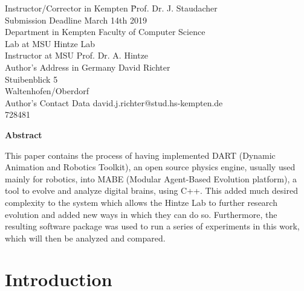 \documentclass[12pt,oneside,listof=totoc,paper=a4,headings=small]{scrbook}
\begin{document}
\parbox{120mm}{
\begin{tabbing}
Instructor/Corrector in Kempten \hspace{1.45cm} \= Prof. Dr. J. Staudacher\\
Submission Deadline                        \> March 14th 2019\\
Department in Kempten                  \> Faculty of Computer Science\\
Lab at MSU \> Hintze Lab\\
Instructor at MSU                   \>Prof. Dr. A. Hintze\\
Author's Address in Germany             \> David Richter\\
																		 \> Stuibenblick 5 \\
                                      Waltenhofen/Oberdorf\\
Author's Contact Data               \> david.j.richter@stud.hs-kempten.de\\
                                     728481
\end{tabbing}
}

\newpage

\vspace*{1cm}

\begin{center}
    \textbf{Abstract}
\end{center}

\vspace*{1cm}

\noindent
This paper contains the process of having implemented DART (Dynamic Animation and Robotics Toolkit), an open source physics engine, usually used mainly for robotics, into MABE (Modular Agent-Based Evolution platform), a tool to evolve and analyze digital brains, using C++. This added much desired complexity to the system which allows the Hintze Lab to further research evolution and added new ways in which they can do so. Furthermore, the resulting software package was used to run a series of experiments in this work, which will then be analyzed and compared.


\tableofcontents
\listoffigures
\lstlistoflistings
\listoftables

\clearpage
\mainmatter
\setcounter{page}{1}

\chapter{Introduction}
\end{document}
